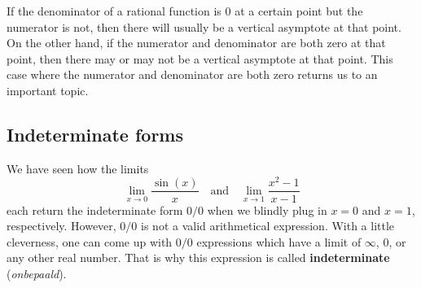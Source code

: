 %
%

If the denominator of a rational function is 0 at a certain point but the numerator is not, then there will usually be a vertical asymptote at that point.  On the other hand,  if the numerator and denominator are both zero at that point, then there may or may not be a vertical asymptote at that point.  This case where the numerator and denominator are both zero returns us to an important topic.


\ifcourse
\subsection{Indeterminate forms}
We have seen how the limits 
$$\lim_{x\rightarrow 0}\frac{\sin (x)}{x}\quad \text{and}\quad \lim_{x\to1}\frac{x^2-1}{x-1}$$ each return the indeterminate form $0/0$ when we blindly plug in $x=0$ and $x=1$, respectively. However, $0/0$ is not a valid arithmetical expression.  With a little cleverness, one can come up with $0/0$ expressions which have a limit of $\infty$, 0, or any other real number.  That is why this expression is called \textbf{indeterminate} (\textit{onbepaald}). 

